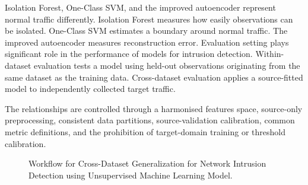 Isolation Forest, One-Class SVM, and the improved autoencoder represent normal traffic differently. Isolation Forest measures how easily 
observations can be isolated. One-Class SVM estimates a boundary around normal traffic. The improved autoencoder measures reconstruction error. 
Evaluation setting plays significant role in the performance of models for intrusion detection. Within-dataset evaluation tests a model 
using held-out observations originating from the same dataset as the training data. Cross-dataset evaluation applies a source-fitted model 
to independently collected target traffic.

The relationships are controlled through a harmonised features space, source-only preprocessing, consistent data partitions, source-validation 
calibration, common metric definitions, and the prohibition of target-domain training or threshold calibration.

\begin{figure}[H]
       \centering
        \caption{Workflow for Cross-Dataset Generalization for Network Intrusion Detection using Unsupervised Machine Learning Model.}
        \label{fig:methodology-pipeline for unsupervised machine learning}
\end{figure}  

